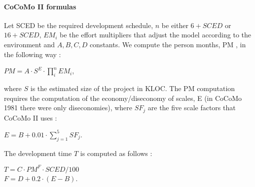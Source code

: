 \paragraph{CoCoMo II formulas} Let SCED be the required development schedule, $n$ be either $6 + SCED$ or $16 + SCED$, $EM_i$ be the effort multipliers that adjust the model according to the environment and $A,B,C,D$ constants. We compute the person months, PM , in the following way :
\begin{center}
    $PM = A \cdot S^E \cdot \prod_{i}^{n} EM_i$,
\end{center}
where $S$ is the estimated size of the project in KLOC. The PM computation requires the computation of the economy/diseconomy of scales, E (in CoCoMo 1981 there were only diseconomies), where $SF_j$ are the five scale factors that CoCoMo II uses :
\begin{center}
    $E = B + 0.01 \cdot \sum_{j=1}^{5} SF_j$.
\end{center}
The development time $T$ is computed as follows :
\begin{center}
    $T = C \cdot PM^F \cdot SCED / 100$\\
    $F = D + 0.2 \cdot (E - B)$.
\end{center}
